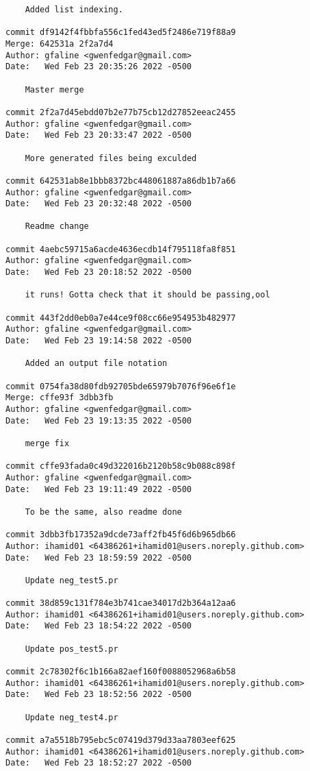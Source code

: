 {\begin{verbatim}
    Added list indexing.

commit df9142f4fbbfa556c1fed43ed5f2486e719f88a9
Merge: 642531a 2f2a7d4
Author: gfaline <gwenfedgar@gmail.com>
Date:   Wed Feb 23 20:35:26 2022 -0500

    Master merge

commit 2f2a7d45ebdd07b2e77b75cb12d27852eeac2455
Author: gfaline <gwenfedgar@gmail.com>
Date:   Wed Feb 23 20:33:47 2022 -0500

    More generated files being exculded

commit 642531ab8e1bbb8372bc448061887a86db1b7a66
Author: gfaline <gwenfedgar@gmail.com>
Date:   Wed Feb 23 20:32:48 2022 -0500

    Readme change

commit 4aebc59715a6acde4636ecdb14f795118fa8f851
Author: gfaline <gwenfedgar@gmail.com>
Date:   Wed Feb 23 20:18:52 2022 -0500

    it runs! Gotta check that it should be passing,ool

commit 443f2dd0eb0a7e44ce9f08cc66e954953b482977
Author: gfaline <gwenfedgar@gmail.com>
Date:   Wed Feb 23 19:14:58 2022 -0500

    Added an output file notation

commit 0754fa38d80fdb92705bde65979b7076f96e6f1e
Merge: cffe93f 3dbb3fb
Author: gfaline <gwenfedgar@gmail.com>
Date:   Wed Feb 23 19:13:35 2022 -0500

    merge fix

commit cffe93fada0c49d322016b2120b58c9b088c898f
Author: gfaline <gwenfedgar@gmail.com>
Date:   Wed Feb 23 19:11:49 2022 -0500

    To be the same, also readme done

commit 3dbb3fb17352a9dcde73aff2fb45f6d6b965db66
Author: ihamid01 <64386261+ihamid01@users.noreply.github.com>
Date:   Wed Feb 23 18:59:59 2022 -0500

    Update neg_test5.pr

commit 38d859c131f784e3b741cae34017d2b364a12aa6
Author: ihamid01 <64386261+ihamid01@users.noreply.github.com>
Date:   Wed Feb 23 18:54:22 2022 -0500

    Update pos_test5.pr

commit 2c78302f6c1b166a82aef160f0088052968a6b58
Author: ihamid01 <64386261+ihamid01@users.noreply.github.com>
Date:   Wed Feb 23 18:52:56 2022 -0500

    Update neg_test4.pr

commit a7a5518b795ebc5c07419d379d33aa7803eef625
Author: ihamid01 <64386261+ihamid01@users.noreply.github.com>
Date:   Wed Feb 23 18:52:27 2022 -0500


\end{verbatim}}
